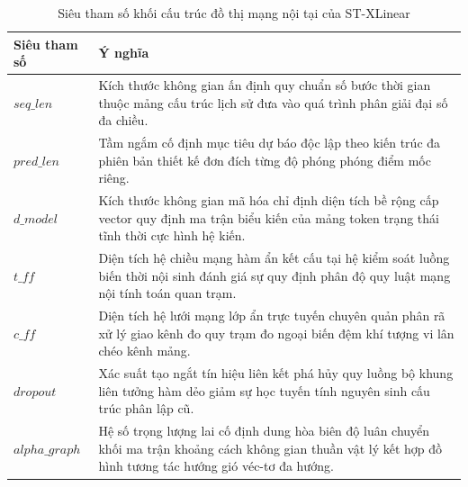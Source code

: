 \begin{table}[htbp]
\centering
\caption{Siêu tham số khối cấu trúc đồ thị mạng nội tại của ST-XLinear}
\label{tab:stxlinear_structure}
\renewcommand{\arraystretch}{1.3}
\begin{tabular}{p{3.8cm} p{10.5cm}}
\toprule
\textbf{Siêu tham số} & \textbf{Ý nghĩa} \\
\midrule
$seq\_len$ & Kích thước không gian ấn định quy chuẩn số bước thời gian thuộc mảng cấu trúc lịch sử đưa vào quá trình phân giải đại số đa chiều. \\
$pred\_len$ & Tầm ngắm cố định mục tiêu dự báo độc lập theo kiến trúc đa phiên bản thiết kế đơn đích từng độ phóng phóng điểm mốc riêng. \\
$d\_model$ & Kích thước không gian mã hóa chỉ định diện tích bề rộng cấp vector quy định ma trận biểu kiến của mảng token trạng thái tĩnh thời cực hình hệ kiến. \\
$t\_ff$ & Diện tích hệ chiều mạng hàm ẩn kết cấu tại hệ kiểm soát luồng biến thời nội sinh đánh giá sự quy định phân độ quy luật mạng nội tính toán quan trạm. \\
$c\_ff$ & Diện tích hệ lưới mạng lớp ẩn trực tuyến chuyên quản phân rã xử lý giao kênh đo quy trạm đo ngoại biến đệm khí tượng vi lân chéo kênh mảng. \\
$dropout$ & Xác suất tạo ngắt tín hiệu liên kết phá hủy quy luồng bộ khung liên tưởng hàm dẻo giảm sự học tuyến tính nguyên sinh cấu trúc phân lập cũ. \\
$alpha\_graph$ & Hệ số trọng lượng lai cố định dung hòa biên độ luân chuyển khối ma trận khoảng cách không gian thuần vật lý kết hợp đồ hình tương tác hướng gió véc-tơ đa hướng. \\
\bottomrule
\end{tabular}
\end{table}

